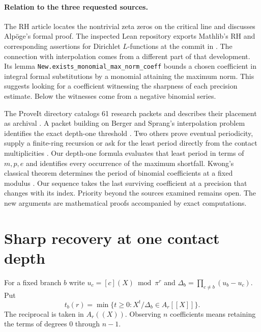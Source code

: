 \documentclass[11pt,letterpaper]{article}
\begin{document}
\paragraph{Relation to the three requested sources.}
The RH article \cite{wiki} locates the nontrivial zeta zeros on the critical line and discusses Alp\"oge's formal proof. The inspected Lean repository exports Mathlib's RH and corresponding assertions for Dirichlet $L$-functions at the commit in \cite{lean}. The connection with interpolation comes from a different part of that development. Its lemma \texttt{New.exists\_monomial\_max\_norm\_coeff} bounds a chosen coefficient in integral formal substitutions by a monomial attaining the maximum norm. This suggests looking for a coefficient witnessing the sharpness of each precision estimate. Below the witnesses come from a negative binomial series.

The ProveIt directory catalogs 61 research packets and describes their placement as archival \cite{catalog}. A packet building on Berger and Sprang's interpolation problem \cite{bs} identifies the exact depth-one threshold \cite{jets}. Two others prove eventual periodicity, supply a finite-ring recursion or ask for the least period directly from the contact multiplicities \cite{pattern,graph}. Our depth-one formula evaluates that least period in terms of $m,p,e$ and identifies every occurrence of the maximum shortfall. Kwong's classical theorem determines the period of binomial coefficients at a fixed modulus \cite{kwong}. Our sequence takes the last surviving coefficient at a precision that changes with its index. Priority beyond the sources examined remains open. The new arguments are mathematical proofs accompanied by exact computations.

\section{Sharp recovery at one contact depth}
For a fixed branch $b$ write $u_c=[c](X)\bmod\pi^r$ and $\Delta_b=\prod_{c\ne b}(u_b-u_c)$. Put
\[
 t_b(r)=\min\{t\ge0:X^t/\Delta_b\in A_r[[X]]\}.
\]
The reciprocal is taken in $A_r((X))$. Observing $n$ coefficients means retaining the terms of degrees $0$ through $n-1$.
\end{document}
